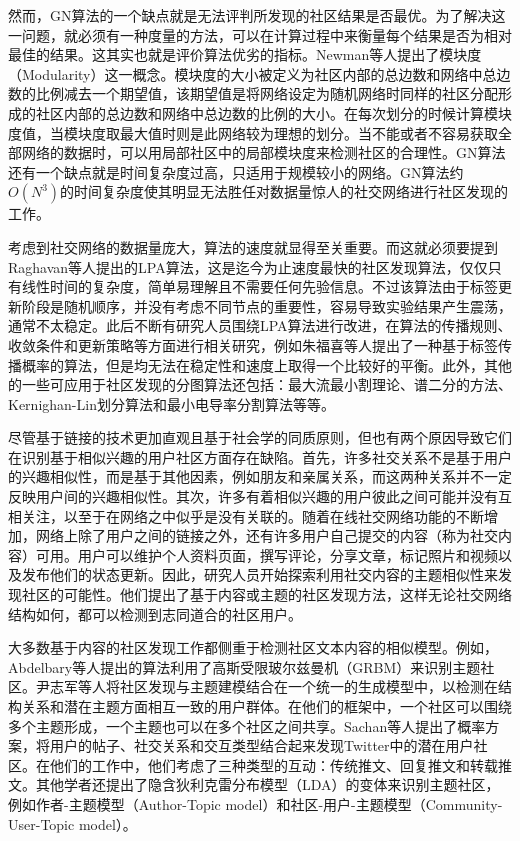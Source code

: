 然而，GN算法的一个缺点就是无法评判所发现的社区结果是否最优。为了解决这一问题，就必须有一种度量的方法，可以在计算过程中来衡量每个结果是否为相对最佳的结果。这其实也就是评价算法优劣的指标。Newman等人提出了模块度（Modularity）\cite{NewmanFind}这一概念。模块度的大小被定义为社区内部的总边数和网络中总边数的比例减去一个期望值，该期望值是将网络设定为随机网络时同样的社区分配形成的社区内部的总边数和网络中总边数的比例的大小。在每次划分的时候计算模块度值，当模块度取最大值时则是此网络较为理想的划分。当不能或者不容易获取全部网络的数据时，可以用局部社区中的局部模块度来检测社区的合理性。GN算法还有一个缺点就是时间复杂度过高，只适用于规模较小的网络。GN算法约$O(N^3)$的时间复杂度使其明显无法胜任对数据量惊人的社交网络进行社区发现的工作。

考虑到社交网络的数据量庞大，算法的速度就显得至关重要。而这就必须要提到Raghavan等人提出的LPA算法\cite{Raghavan2007Near}，这是迄今为止速度最快的社区发现算法，仅仅只有线性时间的复杂度，简单易理解且不需要任何先验信息。不过该算法由于标签更新阶段是随机顺序，并没有考虑不同节点的重要性，容易导致实验结果产生震荡，通常不太稳定。此后不断有研究人员围绕LPA算法进行改进，在算法的传播规则、收敛条件和更新策略等方面进行相关研究，例如朱福喜等人提出了一种基于标签传播概率的算法\cite{Liu2016A}，但是均无法在稳定性和速度上取得一个比较好的平衡。此外，其他的一些可应用于社区发现的分图算法还包括：最大流最小割理论\cite{Jr2009Maximal}、谱二分的方法\cite{Pothen1990Partitioning}、Kernighan-Lin划分算法\cite{Kernigan1970An}和最小电导率分割算法\cite{Leskovec2005Graphs}等等。

尽管基于链接的技术更加直观且基于社会学的同质原则，但也有两个原因导致它们在识别基于相似兴趣的用户社区方面存在缺陷。首先，许多社交关系不是基于用户的兴趣相似性，而是基于其他因素，例如朋友和亲属关系，而这两种关系并不一定反映用户间的兴趣相似性。其次，许多有着相似兴趣的用户彼此之间可能并没有互相关注，以至于在网络之中似乎是没有关联的\cite{Deng2013Interaction}。随着在线社交网络功能的不断增加，网络上除了用户之间的链接之外，还有许多用户自己提交的内容（称为社交内容）可用。用户可以维护个人资料页面，撰写评论，分享文章，标记照片和视频以及发布他们的状态更新。因此，研究人员开始探索利用社交内容的主题相似性来发现社区的可能性。他们提出了基于内容或主题的社区发现方法，这样无论社交网络结构如何，都可以检测到志同道合的社区用户\cite{Natarajan2013Community}。

大多数基于内容的社区发现工作都侧重于检测社区文本内容的相似模型。例如，Abdelbary等人提出的算法\cite{Abdelbary2014Utilizing}利用了高斯受限玻尔兹曼机（GRBM）来识别主题社区。尹志军等人\cite{Yin2012Latent}将社区发现与主题建模结合在一个统一的生成模型中，以检测在结构关系和潜在主题方面相互一致的用户群体。在他们的框架中，一个社区可以围绕多个主题形成，一个主题也可以在多个社区之间共享。Sachan等人\cite{Sachan2012Using}提出了概率方案，将用户的帖子、社交关系和交互类型结合起来发现Twitter中的潜在用户社区。在他们的工作中，他们考虑了三种类型的互动：传统推文、回复推文和转载推文。其他学者还提出了隐含狄利克雷分布模型（LDA）的变体来识别主题社区，例如作者-主题模型（Author-Topic model）\cite{RosenZvi2012The}和社区-用户-主题模型（Community-User-Topic model）\cite{Zhou2006Probabilistic}。

